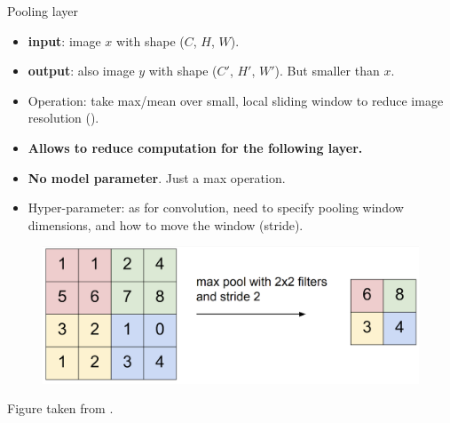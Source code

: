 
\begin{frame}{Pooling layer}
 \vspace{-4mm}
\begin{itemize}
\item \textbf{input}: image $x$ with shape ($C$, $H$, $W$).
\item  \textbf{output}: also image $y$ with shape ($C'$, $H'$, $W'$). But smaller than $x$.
\item Operation: take max/mean over small, local sliding window to reduce image resolution ().
\item \textbf{Allows to reduce computation for the following layer.}
\item \textbf{No model parameter}. Just a max operation.
\item Hyper-parameter: as for convolution, need to specify pooling window dimensions, and how to move the window (stride).
\end{itemize}
\begin{figure}
                        \centering
                        \includegraphics[width=.65\linewidth]{./figures/max-pool-better.png}
\end{figure}
\scriptsize{Figure taken from .}
\end{frame}

